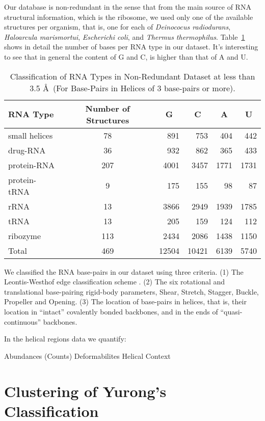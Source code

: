 Our database is  non-redundant in the sense that  from the main source
of RNA structural information, which is the ribosome, we used only one
of the  available structures  per organism, that  is, one for  each of
\textit{Deinococus   radiodurans},   \textit{Haloarcula  marismortui},
\textit{Escherichi          coli},         and         \textit{Thermus
  thermophilus}. Table~\ref{tab:dbase}  shows in detail  the number of
bases per  RNA type in  our dataset. It's  interesting to see  that in
general the content of G and C, is higher than that of A and U.
\begin{table}[htbp]
\begin{center}
\begin{tabular}{|l|c|r|r|r|r|}
\hline
RNA Type & \multicolumn{1}{p{2cm}|}{Number of Structures} & \multicolumn{1}{c|}{G} &
\multicolumn{1}{c|}{C} & \multicolumn{1}{c|}{A} &
\multicolumn{1}{c|}{U} \\ \hline \hline
small helices & 78 & 891 & 753 & 404 & 442 \\ \hline
drug-RNA & 36 & 932 & 862 & 365 & 433 \\ \hline
protein-RNA & 207 & 4001 & 3457 & 1771 & 1731 \\ \hline
protein-tRNA & 9 & 175 & 155 & 98 & 87 \\ \hline
rRNA & 13 & 3866 & 2949 & 1939 & 1785 \\ \hline
tRNA & 13 & 205 & 159 & 124 & 112 \\ \hline
ribozyme & 113 & 2434 & 2086 & 1438 & 1150 \\ \hline
Total & 469 & \multicolumn{1}{c|}{12504} & \multicolumn{1}{c|}{10421} & \multicolumn{1}{c|}{6139} & \multicolumn{1}{c|}{5740} \\ \hline
\end{tabular}
\caption{Classification of RNA Types in Non-Redundant Dataset at less
  than 3.5 \AA~(For Base-Pairs in Helices of 3 base-pairs or more).}
\label{tab:dbase}
\end{center}
\end{table}

We classified the RNA base-pairs  in our dataset using three criteria.
(1) The Leontis-Westhof edge classification scheme \cite{leontis1998}.
(2)  The  six  rotational  and translational  base-pairing  rigid-body
parameters,  Shear, Stretch, Stagger,  Buckle, Propeller  and Opening.
(3) The location of base-pairs  in helices, that is, their location in
``intact''   covalently  bonded   backbones,  and   in  the   ends  of
``quasi-continuous'' backbones.



In the helical regions data we quantify:

Abundances (Counts)
Deformabilites
Helical Context




\section{Clustering of Yurong's Classification}




